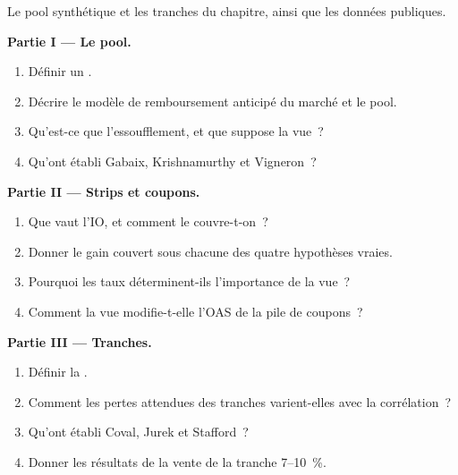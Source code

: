 \begin{problem}\label{pb:s2:mortgage-and-structured-credit-strategies:1}
Le pool synthétique et les tranches du chapitre, ainsi que les données publiques.

\medskip\noindent\textbf{Partie I --- Le pool.}
\begin{enumerate}
\item Définir un .
\item Décrire le modèle de remboursement anticipé du marché et le pool.
\item Qu'est-ce que l'essoufflement, et que suppose la vue~?
\item Qu'ont établi Gabaix, Krishnamurthy et Vigneron~?
\end{enumerate}

\medskip\noindent\textbf{Partie II --- Strips et coupons.}
\begin{enumerate}[resume]
\item Que vaut l'IO, et comment le couvre-t-on~?
\item Donner le gain couvert sous chacune des quatre hypothèses vraies.
\item Pourquoi les taux déterminent-ils l'importance de la vue~?
\item Comment la vue modifie-t-elle l'OAS de la pile de coupons~?
\end{enumerate}

\medskip\noindent\textbf{Partie III --- Tranches.}
\begin{enumerate}[resume]
\item Définir la .
\item Comment les pertes attendues des tranches varient-elles avec la corrélation~?
\item Qu'ont établi Coval, Jurek et Stafford~?
\item Donner les résultats de la vente de la tranche 7--10~\%.
\end{enumerate}


\end{problem}
